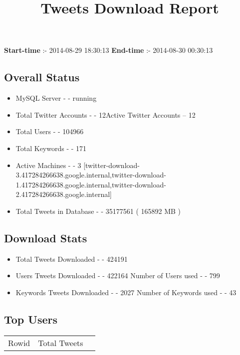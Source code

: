 \documentclass{article}\usepackage[T1]{fontenc}
\begin{document}
\title{\textbf{Tweets Download Report}}
               \date{}
                \maketitle
               \centerline{\textbf{Start-time} :- 2014-08-29 18:30:13 \hspace{40pt} \textbf{End-time} :- 2014-08-30 00:30:13}               \subsection*{Overall Status}                \begin{itemize}                \item MySQL Server - - running               \item Total Twitter Accounts - - 12\newline Active Twitter Accounts -- 12               \item Total Users - - 104966               \item Total Keywords - - 171               \item Active Machines - - 3 [twitter-download-3.417284266638.google.internal,twitter-download-1.417284266638.google.internal,twitter-download-2.417284266638.google.internal]               \item Total Tweets in Database - - 35177561 ( 165892 MB )               \end{itemize}               \subsection*{Download Stats}                \begin{itemize}                \item Total Tweets Downloaded - - 424191               \item Users Tweets Downloaded - - 422164 \newline Number of Users used - - 799               \item Keywords Tweets Downloaded - - 2027 \newline Number of Keywords used - - 43              \end{itemize}              \subsection*{Top Users}\begin{tabular}{|c|c|c|}         \hline         Rowid & Total Tweets \\ 

\end{tabular}
\end{document}
